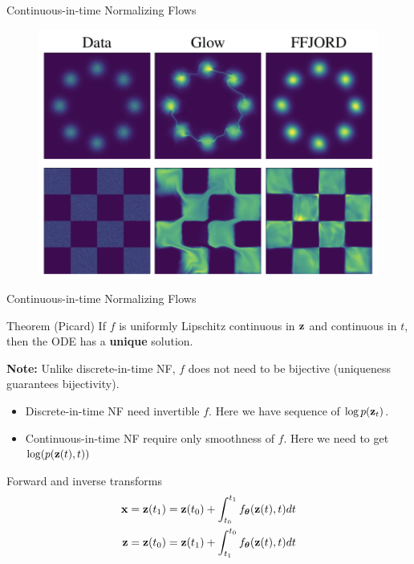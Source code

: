 \begin{frame}{Continuous-in-time Normalizing Flows}
\begin{minipage}[t]{0.6\columnwidth}
\begin{figure}
			\centering
			\includegraphics[width=0.8\linewidth]{figs/ffjord.png}
		\end{figure}
	\end{minipage}
\end{frame}
\begin{frame}{Continuous-in-time Normalizing Flows}
	\begin{block}{Theorem (Picard)}
		If $f$ is uniformly Lipschitz continuous in $\mathbf{z}$ and continuous in $t$, then the ODE has a \textbf{unique} solution.
	\end{block}
	\textbf{Note:} Unlike discrete-in-time NF, $f$ does not need to be bijective (uniqueness guarantees bijectivity).
	\begin{itemize}
		\item Discrete-in-time NF need invertible $f$. Here we have sequence of $\log p(\mathbf{z}_t)$.
		\item Continuous-in-time NF require only smoothness of $f$. Here we need to get $\log(p(\mathbf{z}(t), t))$
	\end{itemize}
	\begin{block}{Forward and inverse transforms}
		\vspace{-0.7cm}
		\begin{align*}
			\mathbf{x} &= \mathbf{z}(t_1) = \mathbf{z}(t_0) + \int_{t_0}^{t_1} f_{\boldsymbol{\theta}}(\mathbf{z}(t), t) dt \\
			\mathbf{z} &= \mathbf{z}(t_0) = \mathbf{z}(t_1) + \int_{t_1}^{t_0} f_{\boldsymbol{\theta}}(\mathbf{z}(t), t) dt
		\end{align*}
		\vspace{-0.7cm}
	\end{block}
\end{frame}
